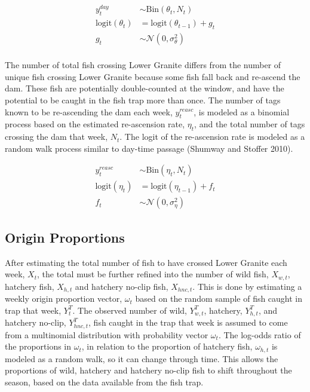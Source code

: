 \documentclass[
  12pt,
]{article}
\begin{document}
\[
\begin{aligned}
  y^{day}_t &\sim \text{Bin} \left(\theta_t, N_t \right) \\
  \text{logit} (\theta_{t}) &= \text{logit} \left( \theta_{t-1} \right) + g_t \\
  g_t &\sim \mathcal{N}(0, \sigma^2_\theta) \\
\end{aligned}
\]

The number of total fish crossing Lower Granite differs from the number of unique fish crossing Lower Granite because some fish fall back and re-ascend the dam. These fish are potentially double-counted at the window, and have the potential to be caught in the fish trap more than once. The number of tags known to be re-ascending the dam each week, \(y^{reasc}_t\), is modeled as a binomial process based on the estimated re-ascension rate, \(\eta_t\), and the total number of tags crossing the dam that week, \(N_t\). The logit of the re-ascension rate is modeled as a random walk process similar to day-time passage (Shumway and Stoffer 2010).

\[
\begin{aligned}
  y^{reasc}_t &\sim \text{Bin} \left(\eta_t, N_t \right) \\
  \text{logit} \left( \eta_{t} \right) &= \text{logit} \left(\eta_{t-1} \right) + f_t \\
  f_t &\sim \mathcal{N}(0, \sigma^2_\eta)
\end{aligned}
\]

\hypertarget{origin-proportions}{%
\subsection{Origin Proportions}\label{origin-proportions}}

After estimating the total number of fish to have crossed Lower Granite each week, \(X_t\), the total must be further refined into the number of wild fish, \(X_{w,t}\), hatchery fish, \(X_{h,t}\) and hatchery no-clip fish, \(X_{hnc, t}\). This is done by estimating a weekly origin proportion vector, \(\omega_t\) based on the random sample of fish caught in trap that week, \(Y^T_t\). The observed number of wild, \(Y^T_{w,t}\), hatchery, \(Y^T_{h,t}\), and hatchery no-clip, \(Y^T_{hnc,t}\), fish caught in the trap that week is assumed to come from a multinomial distribution with probability vector \(\omega_t\). The log-odds ratio of the proportions in \(\omega_t\), in relation to the proportion of hatchery fish, \(\omega_{h,t}\) is modeled as a random walk, so it can change through time. This allows the proportions of wild, hatchery and hatchery no-clip fish to shift throughout the season, based on the data available from the fish trap.
\end{document}
